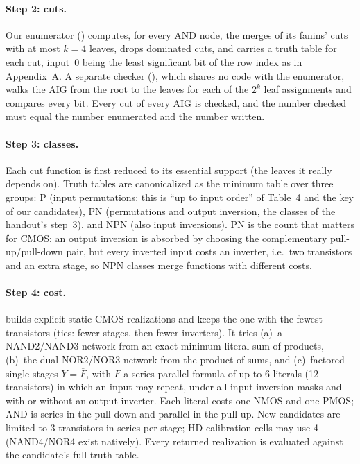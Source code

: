 \documentclass[10pt,a4paper]{article}
\newcommand{\file}[1]{\texttt{\detokenize{#1}}}
\begin{document}
\paragraph{Step 2: cuts.} Our enumerator (\file{dd2/cuts.py}) computes, for every AND node, the
merges of its fanins' cuts with at most $k=4$ leaves, drops dominated cuts, and carries a truth
table for each cut, input~0 being the least significant bit of the row index as in Appendix~A.
A separate checker (\file{dd2/cutcheck.py}), which shares no code with the enumerator, walks the
AIG from the root to the leaves for each of the $2^k$ leaf assignments and compares every bit.
Every cut of every AIG is checked, and the number checked must equal the number enumerated and
the number written.

\paragraph{Step 3: classes.} Each cut function is first reduced to its essential support (the leaves
it really depends on). Truth tables are canonicalized as the minimum table over three groups:
P (input permutations; this is ``up to input order'' of Table~4 and the key of our candidates),
PN (permutations and output inversion, the classes of the handout's step~3), and NPN (also input
inversions). PN is the count that matters for CMOS: an output inversion is absorbed by choosing
the complementary pull-up/pull-down pair, but every inverted input costs an inverter, i.e.\ two
transistors and an extra stage, so NPN classes merge functions with different costs.

\paragraph{Step 4: cost.} \file{dd2m2/cost.py} builds explicit static-CMOS realizations and keeps the one with
the fewest transistors (ties: fewer stages, then fewer inverters). It tries (a)~a NAND2/NAND3
network from an exact minimum-literal sum of products, (b)~the dual NOR2/NOR3 network from the
product of sums, and (c)~factored single stages $Y=\overline{F}$, with $F$ a series-parallel formula
of up to 6 literals (12 transistors) in which an input may repeat, under all input-inversion masks
and with or without an output inverter. Each literal costs one NMOS and one PMOS; AND is series in
the pull-down and parallel in the pull-up. New candidates are limited to 3 transistors in series per
stage; HD calibration cells may use 4 (NAND4/NOR4 exist natively). Every returned realization is
evaluated against the candidate's full truth table.
\end{document}
